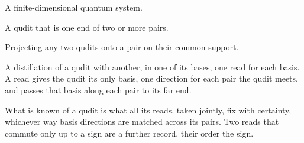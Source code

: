 \begin{chdefinition}[Qudit]\label{box:FRAMEWORK:2}\label{def:qudit}
A finite-dimensional quantum system.
\end{chdefinition}
\begin{chdefinition}[Shared]\label{box:FRAMEWORK:3}\label{def:shared}
A qudit that is one end of two or more pairs.
\end{chdefinition}
\begin{chdefinition}[Distilling]\label{box:FRAMEWORK:4}\label{def:distilling}
Projecting any two qudits onto a pair on their common support.
\end{chdefinition}
\begin{chdefinition}[Read]\label{box:FRAMEWORK:5}\label{def:read}
A distillation of a qudit with another, in one of its bases, one read for each basis. A read gives the qudit its only basis, one direction for each pair the qudit meets, and passes that basis along each pair to its far end.
\end{chdefinition}
\begin{chdefinition}[Known]\label{box:FRAMEWORK:6}\label{def:known}
What is known of a qudit is what all its reads, taken jointly, fix with certainty, whichever way basis directions are matched across its pairs. Two reads that commute only up to a sign are a further record, their order the sign.
\end{chdefinition}
